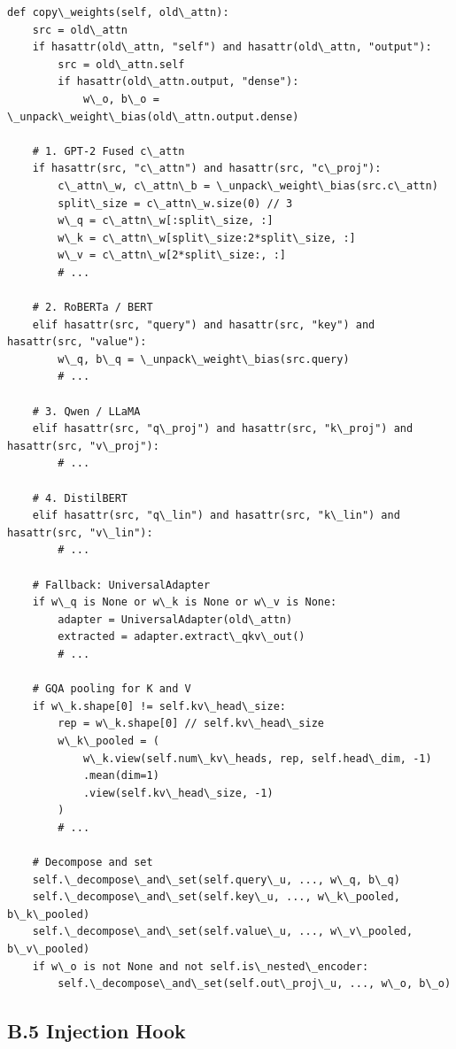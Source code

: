 \begin{lstlisting}
def copy\_weights(self, old\_attn):
    src = old\_attn
    if hasattr(old\_attn, "self") and hasattr(old\_attn, "output"):
        src = old\_attn.self
        if hasattr(old\_attn.output, "dense"):
            w\_o, b\_o = \_unpack\_weight\_bias(old\_attn.output.dense)
    
    # 1. GPT-2 Fused c\_attn
    if hasattr(src, "c\_attn") and hasattr(src, "c\_proj"):
        c\_attn\_w, c\_attn\_b = \_unpack\_weight\_bias(src.c\_attn)
        split\_size = c\_attn\_w.size(0) // 3
        w\_q = c\_attn\_w[:split\_size, :]
        w\_k = c\_attn\_w[split\_size:2*split\_size, :]
        w\_v = c\_attn\_w[2*split\_size:, :]
        # ...
    
    # 2. RoBERTa / BERT
    elif hasattr(src, "query") and hasattr(src, "key") and hasattr(src, "value"):
        w\_q, b\_q = \_unpack\_weight\_bias(src.query)
        # ...
    
    # 3. Qwen / LLaMA
    elif hasattr(src, "q\_proj") and hasattr(src, "k\_proj") and hasattr(src, "v\_proj"):
        # ...
    
    # 4. DistilBERT
    elif hasattr(src, "q\_lin") and hasattr(src, "k\_lin") and hasattr(src, "v\_lin"):
        # ...
    
    # Fallback: UniversalAdapter
    if w\_q is None or w\_k is None or w\_v is None:
        adapter = UniversalAdapter(old\_attn)
        extracted = adapter.extract\_qkv\_out()
        # ...
    
    # GQA pooling for K and V
    if w\_k.shape[0] != self.kv\_head\_size:
        rep = w\_k.shape[0] // self.kv\_head\_size
        w\_k\_pooled = (
            w\_k.view(self.num\_kv\_heads, rep, self.head\_dim, -1)
            .mean(dim=1)
            .view(self.kv\_head\_size, -1)
        )
        # ...
    
    # Decompose and set
    self.\_decompose\_and\_set(self.query\_u, ..., w\_q, b\_q)
    self.\_decompose\_and\_set(self.key\_u, ..., w\_k\_pooled, b\_k\_pooled)
    self.\_decompose\_and\_set(self.value\_u, ..., w\_v\_pooled, b\_v\_pooled)
    if w\_o is not None and not self.is\_nested\_encoder:
        self.\_decompose\_and\_set(self.out\_proj\_u, ..., w\_o, b\_o)
\end{lstlisting}

\subsection{B.5 Injection Hook}

